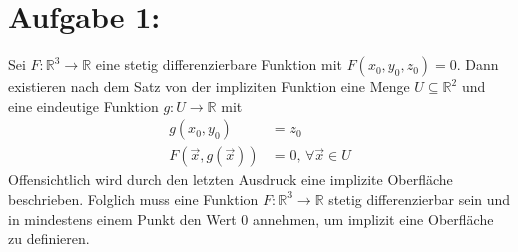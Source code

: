 \section*{Aufgabe 1: }
Sei $F:\mathbb{R}^3\rightarrow\mathbb{R}$ eine stetig differenzierbare Funktion mit $F(x_0, y_0, z_0) = 0$.
Dann existieren nach dem Satz von der impliziten Funktion eine Menge $U \subseteq \mathbb{R}^2$ und eine eindeutige Funktion $g:U\rightarrow\mathbb{R}$ mit
\begin{align*}
  g(x_0, y_0) &= z_0\\
  F(\vec{x}, g(\vec{x})) &= 0 \text{, }\forall \vec{x} \in U
\end{align*}
Offensichtlich wird durch den letzten Ausdruck eine implizite Oberfläche beschrieben. Folglich muss eine Funktion $F:\mathbb{R}^3\rightarrow\mathbb{R}$ stetig differenzierbar sein und in mindestens einem Punkt den Wert 0 annehmen, um implizit eine Oberfläche zu definieren.
